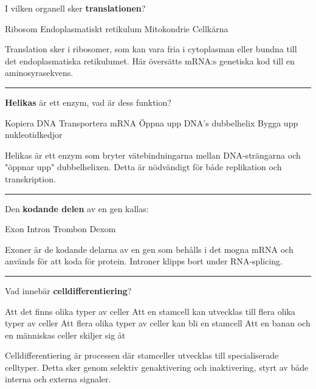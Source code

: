 \documentclass{exam}
\begin{document}
\begin{questions}
\question I vilken organell sker \textbf{translationen}?
\begin{checkboxes}
   \correctchoice Ribosom
   \choice Endoplasmatiskt retikulum
   \choice Mitokondrie
   \choice Cellkärna 
\end{checkboxes}
\begin{solution}
Translation sker i ribosomer, som kan vara fria i cytoplasman eller bundna till det endoplasmatiska retikulumet. Här översätts mRNA:s genetiska kod till en aminosyrasekvens.
\end{solution}

\vspace{5mm}
\hrule
\vspace{5mm}

\question \textbf{Helikas} är ett enzym, vad är dess funktion?
\begin{checkboxes}
   \choice Kopiera DNA
   \choice Transportera mRNA
   \correctchoice Öppna upp DNA's dubbelhelix
   \choice Bygga upp nukleotidkedjor 
\end{checkboxes}
\begin{solution}
Helikas är ett enzym som bryter vätebindningarna mellan DNA-strängarna och "öppnar upp" dubbelhelixen. Detta är nödvändigt för både replikation och transkription.
\end{solution}

\vspace{5mm}
\hrule
\vspace{5mm}

\question Den \textbf{kodande delen} av en gen kallas:
\begin{checkboxes}
   \correctchoice Exon
   \choice Intron
   \choice Trombon
   \choice Dexom 
\end{checkboxes}
\begin{solution}
Exoner är de kodande delarna av en gen som behålls i det mogna mRNA och används för att koda för protein. Introner klipps bort under RNA-splicing.
\end{solution}

\vspace{5mm}
\hrule
\vspace{5mm}

\question Vad innebär \textbf{celldifferentiering}?
\begin{checkboxes}
   \choice Att det finns olika typer av celler
   \correctchoice Att en stamcell kan utvecklas till flera olika typer av celler
   \choice Att flera olika typer av celler kan bli en stamcell
   \choice Att en banan och en människas celler skiljer sig åt 
\end{checkboxes}
\begin{solution}
Celldifferentiering är processen där stamceller utvecklas till specialiserade celltyper. Detta sker genom selektiv genaktivering och inaktivering, styrt av både interna och externa signaler.
\end{solution}


\end{questions}
\end{document}

